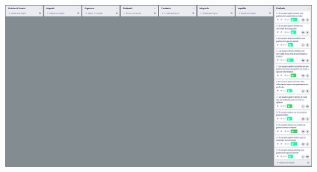 \documentclass[spanish]{beamer}
\begin{document}
\begin{frame}
	\begin{center}
		\includegraphics[scale=0.27]{trello2_9}
	\end{center}
\end{frame}

\begin{frame}
	\begin{center}
	\end{center}
\end{frame}
\end{document}
